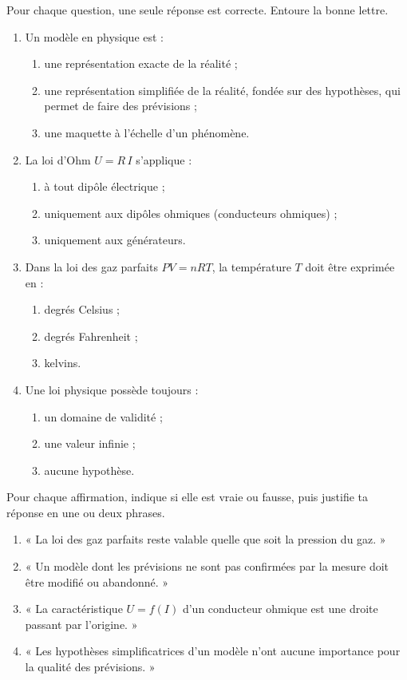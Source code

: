 \documentclass[11pt]{article}
\begin{document}
\begin{exercice}
Pour chaque question, une seule réponse est correcte. Entoure la bonne lettre.
\begin{enumerate}
\item Un modèle en physique est :
\begin{enumerate}
\item une représentation exacte de la réalité ;
\item une représentation simplifiée de la réalité, fondée sur des hypothèses, qui permet de faire des prévisions ;
\item une maquette à l'échelle d'un phénomène.
\end{enumerate}
\item La loi d'Ohm $U = R\,I$ s'applique :
\begin{enumerate}
\item à tout dipôle électrique ;
\item uniquement aux dipôles ohmiques (conducteurs ohmiques) ;
\item uniquement aux générateurs.
\end{enumerate}
\item Dans la loi des gaz parfaits $PV = nRT$, la température $T$ doit être exprimée en :
\begin{enumerate}
\item degrés Celsius ;
\item degrés Fahrenheit ;
\item kelvins.
\end{enumerate}
\item Une loi physique possède toujours :
\begin{enumerate}
\item un domaine de validité ;
\item une valeur infinie ;
\item aucune hypothèse.
\end{enumerate}
\end{enumerate}
\end{exercice}

\begin{exercice}
Pour chaque affirmation, indique si elle est vraie ou fausse, puis justifie ta réponse en une ou deux phrases.
\begin{enumerate}
\item « La loi des gaz parfaits reste valable quelle que soit la pression du gaz. »
\item « Un modèle dont les prévisions ne sont pas confirmées par la mesure doit être modifié ou abandonné. »
\item « La caractéristique $U = f(I)$ d'un conducteur ohmique est une droite passant par l'origine. »
\item « Les hypothèses simplificatrices d'un modèle n'ont aucune importance pour la qualité des prévisions. »
\end{enumerate}
\end{exercice}
\end{document}
